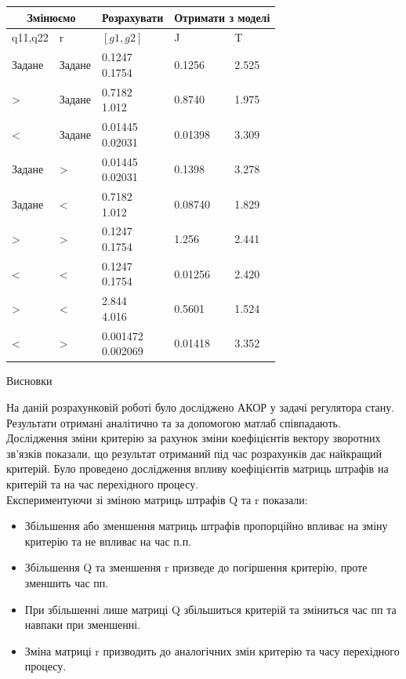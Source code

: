 \documentclass[a4paper]{article}
\begin{document}
\begin{center}
\begin{tabular}{ |p{3cm}||p{3cm}||p{3cm}||p{3cm}||p{3cm}| }
 \hline
 \multicolumn{2}{|c|}{Змінюємо} & Розрахувати & \multicolumn{2}{|c|}{Отримати з моделі}\\
 \hline
 q11,q22 & r & $[g1,g2]$ & J & T\\
 \hline
 Задане & Задане & \makecell{ 0.1247 \\ 0.1754 } & 0.1256 & 2.525 \\
 > & Задане & \makecell{ 0.7182 \\ 1.012 } & 0.8740 & 1.975 \\
 < & Задане & \makecell{ 0.01445 \\ 0.02031 } & 0.01398 & 3.309 \\
 Задане & > & \makecell{ 0.01445 \\ 0.02031 } & 0.1398 & 3.278 \\
 Задане & < & \makecell{ 0.7182 \\ 1.012 } & 0.08740 & 1.829 \\
 > & > & \makecell{ 0.1247 \\ 0.1754 } & 1.256 & 2.441 \\
 < & < & \makecell{ 0.1247 \\ 0.1754 } & 0.01256 & 2.420 \\
 > & < & \makecell{ 2.844 \\ 4.016 } & 0.5601 & 1.524 \\
 < & > & \makecell{ 0.001472 \\ 0.002069 } & 0.01418 & 3.352 \\
 \hline
\end{tabular}
\end{center}

\begin{center}
Висновки \\
\end{center}

\indent На даній розрахунковій роботі було досліджено АКОР у задачі
регулятора стану. Результати отримані аналітично та за допомогою
матлаб співпадають. Дослідження зміни критерію за рахунок зміни
коефіцієнтів вектору зворотних зв’язків показали, що результат
отриманий під час розрахунків дає найкращий критерій. Було
проведено дослідження впливу коефіцієнтів матриць штрафів на
критерій та на час перехідного процесу. \\
\indent Експериментуючи зі зміною матриць штрафів Q та r показали:

\begin{itemize}
  \item Збільшення або зменшення матриць штрафів пропорційно впливає на
зміну критерію та не впливає на час п.п.
  \item Збільшення Q та зменшення r призведе до погіршення критерію, проте
зменшить час пп.
  \item При збільшенні лише матриці Q збільшиться критерій та зміниться час
пп та навпаки при зменшенні.
  \item Зміна матриці r призводить до аналогічних змін критерію та часу
перехідного процесу.
\end{itemize}

\newpage
 
\end{document}
